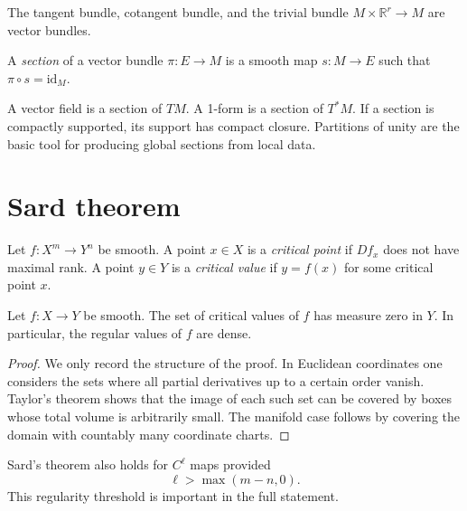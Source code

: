 \begin{example}
\label{example-basic-vector-bundles}
The tangent bundle, cotangent bundle, and the
trivial bundle $M\times\mathbb R^r\to M$ are
vector bundles.
\end{example}

\begin{definition}
\label{definition-section-vector-bundle}
A {\it section} of a vector bundle
$\pi:E\to M$ is a smooth map
$s:M\to E$ such that $\pi\circ s=\text{id}_M$.
\end{definition}

\noindent
A vector field is a section of $TM$.  A
1-form is a section of $T^*M$.  If a section
is compactly supported, its support has
compact closure.  Partitions of unity are the
basic tool for producing global sections from
local data.

\section{Sard theorem}
\label{section-sard-theorem}

\begin{definition}
\label{definition-critical-point}
Let $f:X^m\to Y^n$ be smooth.  A point
$x\in X$ is a {\it critical point} if
$Df_x$ does not have maximal rank.  A point
$y\in Y$ is a {\it critical value} if
$y=f(x)$ for some critical point $x$.
\end{definition}

\begin{theorem}[Sard]
\label{theorem-sard}
Let $f:X\to Y$ be smooth.  The set of
critical values of $f$ has measure zero in
$Y$.  In particular, the regular values of
$f$ are dense.
\end{theorem}

\begin{proof}
We only record the structure of the proof.
In Euclidean coordinates one considers the
sets where all partial derivatives up to a
certain order vanish.  Taylor's theorem shows
that the image of each such set can be
covered by boxes whose total volume is
arbitrarily small.  The manifold case follows
by covering the domain with countably many
coordinate charts.
\end{proof}

\begin{remark}
\label{remark-sard-finite-regularity}
Sard's theorem also holds for $C^\ell$ maps
provided
$$
\ell>\max(m-n,0).
$$
This regularity threshold is important in the
full statement.
\end{remark}

